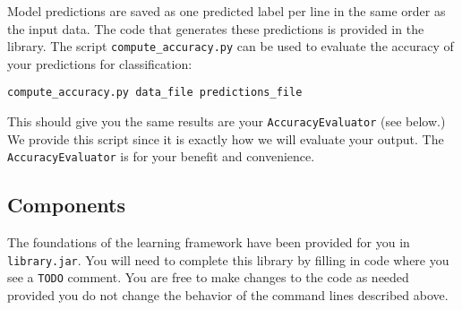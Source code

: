 \documentclass[11pt]{article}
\begin{document}
Model predictions are saved as one predicted label per line in the same order as the input data. The code that generates these predictions is provided in the library. The script {\tt compute\_accuracy.py} can be used to evaluate the accuracy of your predictions for classification:
\begin{footnotesize}
\begin{verbatim}
compute_accuracy.py data_file predictions_file
\end{verbatim}
\end{footnotesize}

This should give you the same results are your {\tt AccuracyEvaluator} (see below.) We provide this script since it is exactly how we will evaluate your
output. The {\tt AccuracyEvaluator} is for your benefit and convenience.

\subsection{Components}
The foundations of the learning framework have been provided for you in {\tt library.jar}. You will need to complete this library by filling in code where you see a {\tt TODO} comment. You are free to make changes to the code as needed provided you do not change the behavior of the command lines described above.
\end{document}
